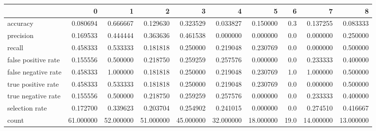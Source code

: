 \begin{tabular}{lrrrrrrrrr}
\toprule
{} &          0 &          1 &          2 &          3 &          4 &          5 &     6 &          7 &          8 \\
\midrule
accuracy            &   0.080694 &   0.666667 &   0.129630 &   0.323529 &   0.033827 &   0.150000 &   0.3 &   0.137255 &   0.083333 \\
precision           &   0.169533 &   0.444444 &   0.363636 &   0.461538 &   0.000000 &   0.000000 &   0.0 &   0.000000 &   0.250000 \\
recall              &   0.458333 &   0.533333 &   0.181818 &   0.250000 &   0.219048 &   0.230769 &   0.0 &   0.000000 &   0.500000 \\
false positive rate &   0.155556 &   0.500000 &   0.218750 &   0.259259 &   0.257576 &   0.000000 &   0.0 &   0.233333 &   0.400000 \\
false negative rate &   0.458333 &   1.000000 &   0.181818 &   0.250000 &   0.219048 &   0.230769 &   1.0 &   1.000000 &   0.500000 \\
true positive rate  &   0.458333 &   0.533333 &   0.181818 &   0.250000 &   0.219048 &   0.230769 &   0.0 &   0.000000 &   0.500000 \\
true negative rate  &   0.155556 &   0.500000 &   0.218750 &   0.259259 &   0.257576 &   0.000000 &   0.0 &   0.233333 &   0.400000 \\
selection rate      &   0.172700 &   0.339623 &   0.203704 &   0.254902 &   0.241015 &   0.000000 &   0.0 &   0.274510 &   0.416667 \\
count               &  61.000000 &  52.000000 &  51.000000 &  45.000000 &  32.000000 &  18.000000 &  19.0 &  14.000000 &  13.000000 \\
\bottomrule
\end{tabular}
